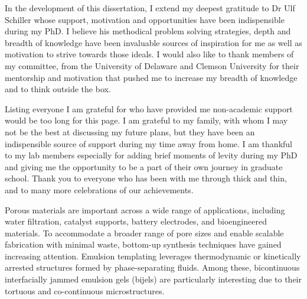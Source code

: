 \begin{front} %


In the development of this dissertation, I extend my deepest gratitude to Dr Ulf Schiller whose support, motivation and 
opportunities have been indispensible during my PhD. I believe his methodical problem solving strategies, depth and 
breadth of knowledge have been invaluable sources of inspiration for me as well as 
motivation to strive towards those ideals. I would also like to thank members of my committee, 
from the University of Delaware and Clemson University for their mentorship 
and motivation that pushed me to increase my breadth of knowledge and to think outside the box.

Listing everyone I am grateful for who have provided me non-academic support would be too long for this page. 
I am grateful to my family, with whom I may not be the best at 
discussing my future plans, but they have been an indispensible source of support during my time away from home. 
I am thankful to my lab members especially for adding brief moments of levity during my PhD and giving me the 
opportunity to be a part of their own journey in graduate school. Thank you to everyone who has been with me 
through thick and thin, and to many more celebrations of our achievements. 




\maketocloflot

    Porous materials are important across a wide range of applications, including water filtration, catalyst supports, 
    battery electrodes, and bioengineered materials. To accommodate a broader range of pore sizes and enable scalable 
    fabrication with minimal waste, bottom-up synthesis techniques have gained increasing attention. Emulsion templating 
    leverages thermodynamic or kinetically arrested structures formed by phase-separating fluids. Among these, bicontinuous 
    interfacially jammed emulsion gels (bijels) are particularly interesting due to their tortuous and co-continuous microstructures.


\end{front}
